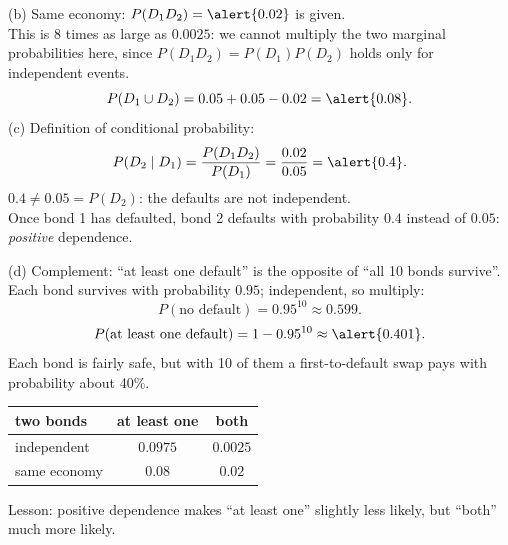 \begin{slides}
	\small
	(b) Same economy: $P(D_1D_2)=\alert{0.02}$ is given.
	\pause\\[1mm]
	This is 8 times as large as $0.0025$: we cannot multiply the two
	marginal probabilities here, since $P(D_1D_2)=P(D_1)P(D_2)$ holds only
	for independent events.
	\pause
	\[ P(D_1\cup D_2)=0.05+0.05-0.02=\alert{0.08}. \]
	\pause
	(c) Definition of conditional probability:
	\[ P(D_2\mid D_1)=\frac{P(D_1D_2)}{P(D_1)}=\frac{0.02}{0.05}=\alert{0.4}. \]
	\pause
	$0.4\ne0.05=P(D_2)$: the defaults are \alert{not independent}.
	\pause\\[1mm]
	Once bond 1 has defaulted, bond 2 defaults with probability $0.4$
	instead of $0.05$: \emph{positive} dependence.
\end{slides}

\begin{slides}
	\small
	(d) Complement: ``at least one default'' is the opposite of ``all 10
	bonds survive''.
	\pause\\[1mm]
	Each bond survives with probability $0.95$; independent, so multiply:
	\[ P(\text{no default})=0.95^{10}\approx0.599. \]
	\pause
	\vspace{-2mm}
	\[ P(\text{at least one default})=1-0.95^{10}\approx\alert{0.401}. \]
	\pause
	Each bond is fairly safe, but with 10 of them a first-to-default swap
	pays with probability about 40\%.
	\pause
	\begin{center}
		\begin{tabular}{lcc}
			two bonds    & at least one & both     \\ \hline
			independent  & $0.0975$     & $0.0025$ \\
			same economy & $0.08$       & $0.02$
		\end{tabular}
	\end{center}
	\alert{Lesson:} positive dependence makes ``at least one'' slightly less
	likely, but ``both'' much more likely.
\end{slides}

